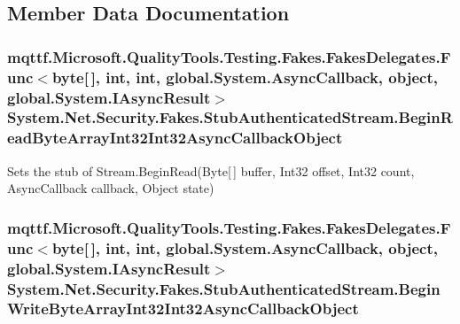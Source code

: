 \subsection{Member Data Documentation}
\hypertarget{class_system_1_1_net_1_1_security_1_1_fakes_1_1_stub_authenticated_stream_afb64fd093777b99dabf328f65a0f9fda}{
\subsubsection[{Begin\-Read\-Byte\-Array\-Int32\-Int32\-Async\-Callback\-Object}]{\setlength{\rightskip}{0pt plus 5cm}mqttf.\-Microsoft.\-Quality\-Tools.\-Testing.\-Fakes.\-Fakes\-Delegates.\-Func$<$byte\mbox{[}$\,$\mbox{]}, int, int, global.\-System.\-Async\-Callback, object, global.\-System.\-I\-Async\-Result$>$ System.\-Net.\-Security.\-Fakes.\-Stub\-Authenticated\-Stream.\-Begin\-Read\-Byte\-Array\-Int32\-Int32\-Async\-Callback\-Object}}\label{class_system_1_1_net_1_1_security_1_1_fakes_1_1_stub_authenticated_stream_afb64fd093777b99dabf328f65a0f9fda}


Sets the stub of Stream.\-Begin\-Read(\-Byte\mbox{[}$\,$\mbox{]} buffer, Int32 offset, Int32 count, Async\-Callback callback, Object state)

\hypertarget{class_system_1_1_net_1_1_security_1_1_fakes_1_1_stub_authenticated_stream_a8da713aa6f4bf4c6c68ff85aa808db3e}{
\subsubsection[{Begin\-Write\-Byte\-Array\-Int32\-Int32\-Async\-Callback\-Object}]{\setlength{\rightskip}{0pt plus 5cm}mqttf.\-Microsoft.\-Quality\-Tools.\-Testing.\-Fakes.\-Fakes\-Delegates.\-Func$<$byte\mbox{[}$\,$\mbox{]}, int, int, global.\-System.\-Async\-Callback, object, global.\-System.\-I\-Async\-Result$>$ System.\-Net.\-Security.\-Fakes.\-Stub\-Authenticated\-Stream.\-Begin\-Write\-Byte\-Array\-Int32\-Int32\-Async\-Callback\-Object}}\label{class_system_1_1_net_1_1_security_1_1_fakes_1_1_stub_authenticated_stream_a8da713aa6f4bf4c6c68ff85aa808db3e}


